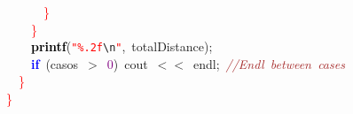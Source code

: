 \documentclass[10pt,a4paper,twoside]{article}
\begin{document}
{{{{{{\mbox{}\ \ \ \ \ \ \textcolor{Red}{\}} \\
\mbox{}\ \ \ \ \textcolor{Red}{\}} \\
\mbox{}\ \ \ \ \textbf{\textcolor{Black}{printf}}\textcolor{BrickRed}{(}\texttt{\textcolor{Red}{"{}\%.2f}}\texttt{\textcolor{CarnationPink}{\textbackslash{}n}}\texttt{\textcolor{Red}{"{}}}\textcolor{BrickRed}{,}\ totalDistance\textcolor{BrickRed}{);} \\
\mbox{}\ \ \ \ \textbf{\textcolor{Blue}{if}}\ \textcolor{BrickRed}{(}casos\ \textcolor{BrickRed}{$>$}\ \textcolor{Purple}{0}\textcolor{BrickRed}{)}\ cout\ \textcolor{BrickRed}{$<<$}\ endl\textcolor{BrickRed}{;}\ \textit{\textcolor{Brown}{//Endl\ between\ cases}} \\
\mbox{}\ \ \textcolor{Red}{\}} \\
\mbox{}\textcolor{Red}{\}} \\
} \normalfont\normalsize

}}}}}
\end{document}
